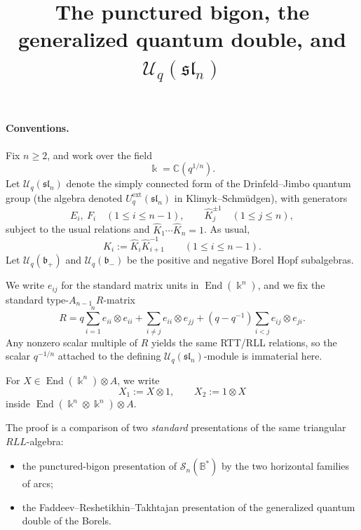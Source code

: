 \documentclass[11pt]{article}
\newcommand{\kk}{\Bbbk}
\newcommand{\Uc}{\mathcal U}
\newcommand{\bcS}{\mathcal S}
\newcommand{\fb}{\mathfrak b}
\newcommand{\fB}{\mathbb B}
\begin{document}
\title{The punctured bigon, the generalized quantum double, and \(\Uc_q(\mathfrak{sl}_n)\)}
\author{}
\date{}
\maketitle

\paragraph{Conventions.}
Fix \(n\ge 2\), and work over the field
\[
\kk=\mathbb C(q^{1/n}).
\]
Let \(\Uc_q(\mathfrak{sl}_n)\) denote the simply connected form of the Drinfeld--Jimbo quantum group (the algebra denoted \(U_q^{\mathrm{ext}}(\mathfrak{sl}_n)\) in Klimyk--Schm\"udgen), with generators
\[
E_i,\ F_i\quad (1\le i\le n-1),\qquad \hat K_j^{\pm1}\quad (1\le j\le n),
\]
subject to the usual relations and \(\hat K_1\cdots \hat K_n=1\).  As usual,
\[
K_i:=\hat K_i\hat K_{i+1}^{-1}\qquad (1\le i\le n-1).
\]
Let \(\Uc_q(\fb_+)\) and \(\Uc_q(\fb_-)\) be the positive and negative Borel Hopf subalgebras.

We write \(e_{ij}\) for the standard matrix units in \(\operatorname{End}(\kk^n)\), and we fix the standard type-\(A_{n-1}\) \(R\)-matrix
\begin{equation}\label{eq:R}
R
=
q\sum_{i=1}^n e_{ii}\otimes e_{ii}
+
\sum_{i\neq j} e_{ii}\otimes e_{jj}
+
(q-q^{-1})\sum_{i<j} e_{ij}\otimes e_{ji}.
\end{equation}
Any nonzero scalar multiple of \(R\) yields the same RTT/RLL relations, so the scalar
\(q^{-1/n}\) attached to the defining \(\Uc_q(\mathfrak{sl}_n)\)-module is immaterial here.

For \(X\in \operatorname{End}(\kk^n)\otimes A\), we write
\[
X_1:=X\otimes 1,\qquad X_2:=1\otimes X
\]
inside \(\operatorname{End}(\kk^n\otimes \kk^n)\otimes A\).

\medskip

The proof is a comparison of two \emph{standard} presentations of the same triangular
\(RLL\)-algebra:
\begin{itemize}
\item the punctured-bigon presentation of \(\bcS_n(\fB^\ast)\) by the two horizontal families of arcs;
\item the Faddeev--Reshetikhin--Takhtajan presentation of the generalized quantum double of the Borels.
\end{itemize}
\end{document}
